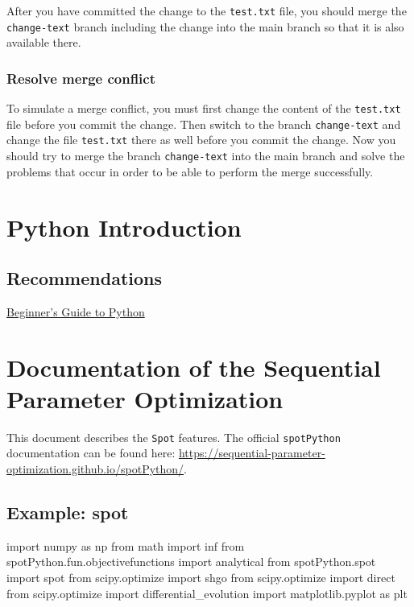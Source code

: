 \documentclass[
  letterpaper,
  DIV=11,
  numbers=noendperiod]{scrreprt}
\newenvironment{Shaded}{\begin{snugshade}}{\end{snugshade}}
\newcommand{\ImportTok}[1]{\textcolor[rgb]{0.00,0.46,0.62}{#1}}
\newcommand{\NormalTok}[1]{\textcolor[rgb]{0.00,0.23,0.31}{#1}}
\begin{document}
After you have committed the change to the \texttt{test.txt} file, you
should merge the \texttt{change-text} branch including the change into
the main branch so that it is also available there.

\subsection{Resolve merge conflict}\label{resolve-merge-conflict}

To simulate a merge conflict, you must first change the content of the
\texttt{test.txt} file before you commit the change. Then switch to the
branch \texttt{change-text} and change the file \texttt{test.txt} there
as well before you commit the change. Now you should try to merge the
branch \texttt{change-text} into the main branch and solve the problems
that occur in order to be able to perform the merge successfully.

\chapter{Python Introduction}\label{python-introduction}

\section{Recommendations}\label{recommendations}

\href{https://wiki.python.org/moin/BeginnersGuide}{Beginner's Guide to
Python}

\chapter{Documentation of the Sequential Parameter
Optimization}\label{documentation-of-the-sequential-parameter-optimization}

This document describes the \texttt{Spot} features. The official
\texttt{spotPython} documentation can be found here:
\url{https://sequential-parameter-optimization.github.io/spotPython/}.

\section{Example: spot}\label{example-spot}

\begin{Shaded}
\begin{Highlighting}[]
\ImportTok{import}\NormalTok{ numpy }\ImportTok{as}\NormalTok{ np}
\ImportTok{from}\NormalTok{ math }\ImportTok{import}\NormalTok{ inf}
\ImportTok{from}\NormalTok{ spotPython.fun.objectivefunctions }\ImportTok{import}\NormalTok{ analytical}
\ImportTok{from}\NormalTok{ spotPython.spot }\ImportTok{import}\NormalTok{ spot}
\ImportTok{from}\NormalTok{ scipy.optimize }\ImportTok{import}\NormalTok{ shgo}
\ImportTok{from}\NormalTok{ scipy.optimize }\ImportTok{import}\NormalTok{ direct}
\ImportTok{from}\NormalTok{ scipy.optimize }\ImportTok{import}\NormalTok{ differential\_evolution}
\ImportTok{import}\NormalTok{ matplotlib.pyplot }\ImportTok{as}\NormalTok{ plt}
\end{Highlighting}
\end{Shaded}
\end{document}
